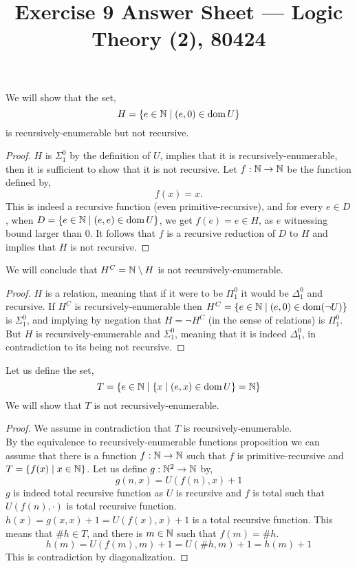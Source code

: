 
\title{Exercise 9 Answer Sheet --- Logic Theory (2), 80424}

\DeclareMathOperator{\PA}{PA}
\DeclareMathOperator{\Coll}{Coll}
\DeclareMathOperator{\Ind}{Ind}
\DeclareMathOperator{\Sat}{Sat}


\maketitle
\maketitleprint[yellow]

\question{}
\subquestion{}
We will show that the set,
\[
	H
	= \{ e \in \mathbb{N} \mid (e, 0) \in \operatorname{dom} U \}
\]
is recursively-enumerable but not recursive.
\begin{proof}
	$H$ is $\Sigma_1^0$ by the definition of $U$, implies that it is recursively-enumerable, then it is sufficient to show that it is not recursive.
	Let $f : \mathbb{N} \to \mathbb{N}$ be the function defined by,
	\[
		f(x) = x
	.\]
	This is indeed a recursive function (even primitive-recursive), and for every $e \in D$, when $D = \{ e \in \mathbb{N} \mid (e, e) \in \operatorname{dom} U \}$, we get $f(e) = e \in H$, as $e$ witnessing bound larger than $0$.
	It follows that $f$ is a recursive reduction of $D$ to $H$ and implies that $H$ is not recursive.
\end{proof}

\subquestion{}
We will conclude that $H^C = \mathbb{N} \setminus H$ is not recursively-enumerable.
\begin{proof}
	$H$ is a relation, meaning that if it were to be $\Pi_1^0$ it would be $\Delta_1^0$ and recursive.
	If $H^C$ is recursively-enumerable then $H^C = \{ e \in \mathbb{N} \mid (e, 0) \in \operatorname{dom}(\lnot U) \}$ is $\Sigma_1^0$, and implying by negation that $H = \lnot H^C$ (in the sense of relations) is $\Pi_1^0$.
	But $H$ is recursively-enumerable and $\Sigma_1^0$, meaning that it is indeed $\Delta_1^0$, in contradiction to its being not recursive.
\end{proof}

\subquestion{}
Let us define the set,
\[
	T = \{ e \in \mathbb{N} \mid \{ x \mid (e, x) \in \operatorname{dom} U \} = \mathbb{N} \}
\]
We will show that $T$ is not recursively-enumerable.
\begin{proof}
	We assume in contradiction that $T$ is recursively-enumerable. \\
	By the equivalence to recursively-enumerable functions proposition we can assume that there is a function $f : \mathbb{N} \to \mathbb{N}$ such that $f$ is primitive-recursive and $T = \{ f(x) \mid x \in \mathbb{N} \}$.
	Let us define $g : \mathbb{N}^2 \to \mathbb{N}$ by,
	\[
		g(n, x) = U(f(n), x) + 1
	\]
	$g$ is indeed total recursive function as $U$ is recursive and $f$ is total such that $U(f(n), \cdot)$ is total recursive function.
	$h(x) = g(x, x) + 1 = U(f(x), x) + 1$ is a total recursive function.
	This means that $\# h \in T$, and there is $m \in \mathbb{N}$ such that $f(m) = \# h$.
	\[
		h(m)
		= U(f(m), m) + 1
		= U(\# h, m) + 1
		= h(m) + 1
	\]
	This is contradiction by diagonalization.
\end{proof}

